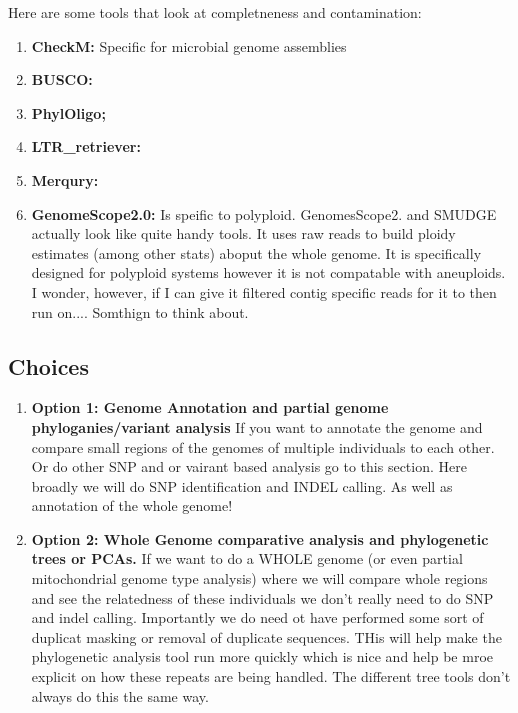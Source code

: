 \documentclass{article}
\begin{document}
    Here are some tools that look at completneness and contamination:
    \begin{enumerate}
        \item \textbf{CheckM:} Specific for microbial genome assemblies
        \item \textbf{BUSCO:}
        \item \textbf{PhylOligo;}
        \item \textbf{LTR_retriever:}
        \item \textbf{Merqury:}
        \item \textbf{GenomeScope2.0:} Is speific to polyploid.   GenomesScope2. and SMUDGE actually look like quite handy tools.   It uses raw reads to build ploidy estimates (among other stats) aboput the whole genome.   It is specifically designed for polyploid systems however it is not compatable with aneuploids.   I wonder, however, if I can give it filtered contig specific reads for it to then run on....   Somthign to think about.
    \end{enumerate}


    \newpage
    \subsection{\textbf{Choices}}
    \begin{enumerate}
        \item \textbf{Option 1: Genome Annotation and partial genome phyloganies/variant analysis} If you want to annotate the genome and compare small regions of the genomes of multiple individuals to each other.   Or do other SNP and or vairant based analysis go to this section.   Here broadly we will do SNP identification and INDEL calling.   As well as annotation of the whole genome!
        \item \textbf{Option 2: Whole Genome comparative analysis and phylogenetic trees or PCAs.}  If we want to do a WHOLE genome (or even partial mitochondrial genome type analysis) where we will compare whole regions and see the relatedness of these individuals we don't really need to do SNP and indel calling.  Importantly we do need ot have performed some sort of duplicat masking or removal of duplicate sequences.   THis will help make the phylogenetic analysis tool run more quickly which is nice and help be mroe explicit on how these repeats are being handled.   The different tree tools don't always do this the same way.
    \end{enumerate}

    \newpage
\end{document}
